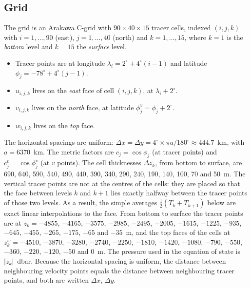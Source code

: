 \documentclass{article}
\begin{document}
\subsection{Grid}\label{sec:gridcells}
The grid is an Arakawa C-grid with $90 \times 40 \times 15$ tracer cells, indexed $(i,j,k)$ with $i = 1,\dots,90$ (east), $j = 1,\dots,40$ (north) and $k = 1,\dots,15$, where $k = 1$ is the \emph{bottom} level and $k = 15$ the \emph{surface} level.
\begin{itemize}
\item Tracer points are at longitude $\lambda_i = 2^\circ + 4^\circ(i-1)$ and latitude $\phi_j = -78^\circ + 4^\circ(j-1)$.
\item $u_{i,j,k}$ lives on the \emph{east} face of cell $(i,j,k)$, at $\lambda_i + 2^\circ$.
\item $v_{i,j,k}$ lives on the \emph{north} face, at latitude $\phi^v_j = \phi_j + 2^\circ$.
\item $w_{i,j,k}$ lives on the \emph{top} face.
\end{itemize}
The horizontal spacings are uniform: $\Delta x = \Delta y = 4^\circ \times \pi a / 180^\circ \approx 444.7$~km, with $a = 6370$~km.
The metric factors are $c_j = \cos\phi_j$ (at tracer points) and $c^v_j = \cos\phi^v_j$ (at $v$ points).
The cell thicknesses $\Delta z_k$, from bottom to surface, are 690, 640, 590, 540, 490, 440, 390, 340, 290, 240, 190, 140, 100, 70 and 50~m.
The vertical tracer points are not at the centres of the cells: they are placed so that the face between levels $k$ and $k+1$ lies exactly halfway between the tracer points of those two levels.
As a result, the simple averages $\tfrac12(T_k + T_{k+1})$ below are exact linear interpolations to the face.
From bottom to surface the tracer points are at $z_k = -4855$, $-4165$, $-3575$, $-2985$, $-2495$, $-2005$, $-1615$, $-1225$, $-935$, $-645$, $-455$, $-265$, $-175$, $-65$ and $-35$~m, and the top faces of the cells at $z^w_k = -4510$, $-3870$, $-3280$, $-2740$, $-2250$, $-1810$, $-1420$, $-1080$, $-790$, $-550$, $-360$, $-220$, $-120$, $-50$ and $0$~m.
The pressure used in the equation of state is $|z_k|$~dbar.
Because the horizontal spacing is uniform, the distance between neighbouring velocity points equals the distance between neighbouring tracer points, and both are written $\Delta x$, $\Delta y$.
\end{document}

